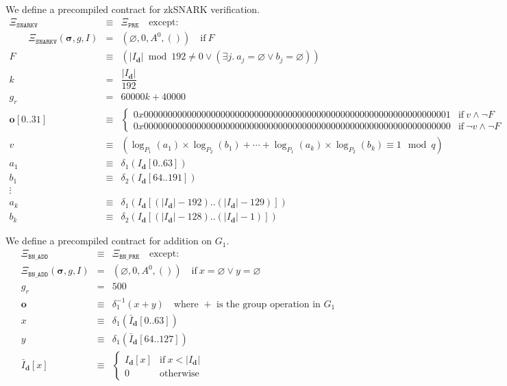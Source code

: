 \documentclass[9pt,oneside]{amsart}
\begin{document}
We define a precompiled contract for zkSNARK verification.
\begin{eqnarray}
\Xi_{\mathtt{SNARKV}}&\equiv&\Xi_{\mathtt{PRE}}\quad\text{except:}\\
\qquad\Xi_{\mathtt{SNARKV}}(\boldsymbol\sigma,g,I)&=&(\varnothing,0,A^0,())\quad\text{if}\ F\\
F&\equiv&(|I_\mathbf{d}|\bmod 192\neq 0\vee(\exists j.\ a_j=\varnothing\vee b_j=\varnothing))\\
k &=& \dfrac{|I_\mathbf{d}|}{192} \\
g_r&=& 60000k + 40000 \\
\mathbf o[0..31]&\equiv&\begin{cases}
0x0000000000000000000000000000000000000000000000000000000000000001&\text{if}\ v\wedge\neg F\\
0x0000000000000000000000000000000000000000000000000000000000000000&\text{if}\ \neg v\wedge\neg F
\end{cases}\\
v&\equiv&(\log_{P_1}(a_1)\times\log_{P_2}(b_1)+\cdots+\log_{P_1}(a_k)\times\log_{P_2}(b_k)\equiv 1\mod q)\\
a_1&\equiv&\delta_1(I_{\mathbf d}[0..63])\\
b_1&\equiv&\delta_2(I_{\mathbf d}[64..191])\\\nonumber
\vdots\\
a_k&\equiv&\delta_1(I_{\mathbf d}[(|I_{\mathbf d}|-192)..(|I_{\mathbf d}|-129)])\\
b_k&\equiv&\delta_2(I_{\mathbf d}[(|I_{\mathbf d}|-128)..(|I_{\mathbf d}|-1)])
\end{eqnarray}

We define a precompiled contract for addition on $G_1$.
\begin{eqnarray}
\Xi_{\mathtt{BN\_ADD}}&\equiv&\Xi_{\mathtt{BN\_PRE}}\quad\text{except:}\\
\Xi_{\mathtt{BN\_ADD}}(\boldsymbol\sigma,g,I)&=&(\varnothing,0,A^0,())\quad\text{if}\ x=\varnothing\vee y=\varnothing\\
g_r &=& 500\\
\mathbf o&\equiv&\delta_1^{-1}(x+y)\quad\text{where $+$ is the group operation in $G_1$}\\
x&\equiv&\delta_1(\bar I_{\mathbf d}[0..63])\\
y&\equiv&\delta_1(\bar I_{\mathbf d}[64..127])\\
\label{eq:complemented_input}\bar I_{\mathbf d}[x]&\equiv&\begin{cases}
I_{\mathbf d}[x]&\text{if}\ x < |I_{\mathbf d}|\\
0&\text{otherwise}
\end{cases}
\end{eqnarray}
\end{document}
